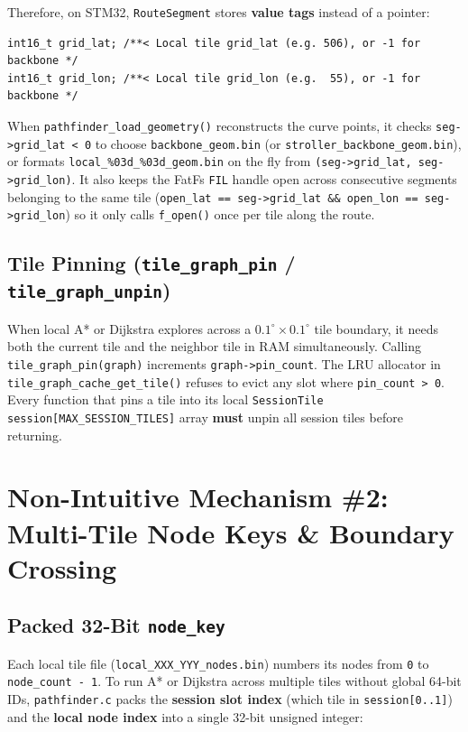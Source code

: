 \documentclass[11pt,a4paper]{article}
\begin{document}
Therefore, on STM32, \texttt{RouteSegment} stores \textbf{value tags} instead of a pointer:
\begin{lstlisting}[caption={Value-based geometry source tagging in \texttt{RouteSegment}}]
int16_t grid_lat; /**< Local tile grid_lat (e.g. 506), or -1 for backbone */
int16_t grid_lon; /**< Local tile grid_lon (e.g.  55), or -1 for backbone */
\end{lstlisting}
When \texttt{pathfinder\_load\_geometry()} reconstructs the curve points, it checks \texttt{seg->grid\_lat < 0} to choose \texttt{backbone\_geom.bin} (or \texttt{stroller\_backbone\_geom.bin}), or formats \texttt{local\_\%03d\_\%03d\_geom.bin} on the fly from \texttt{(seg->grid\_lat, seg->grid\_lon)}. It also keeps the FatFs \texttt{FIL} handle open across consecutive segments belonging to the same tile (\texttt{open\_lat == seg->grid\_lat \&\& open\_lon == seg->grid\_lon}) so it only calls \texttt{f\_open()} once per tile along the route.

\subsection{Tile Pinning (\texttt{tile\_graph\_pin} / \texttt{tile\_graph\_unpin})}

When local A* or Dijkstra explores across a $0.1^\circ \times 0.1^\circ$ tile boundary, it needs both the current tile and the neighbor tile in RAM simultaneously. Calling \texttt{tile\_graph\_pin(graph)} increments \texttt{graph->pin\_count}. The LRU allocator in \texttt{tile\_graph\_cache\_get\_tile()} refuses to evict any slot where \texttt{pin\_count > 0}. Every function that pins a tile into its local \texttt{SessionTile session[MAX\_SESSION\_TILES]} array \textbf{must} unpin all session tiles before returning.

\section{Non-Intuitive Mechanism \#2: Multi-Tile Node Keys \& Boundary Crossing}

\subsection{Packed 32-Bit \texttt{node\_key}}

Each local tile file (\texttt{local\_XXX\_YYY\_nodes.bin}) numbers its nodes from \texttt{0} to \texttt{node\_count - 1}. To run A* or Dijkstra across multiple tiles without global 64-bit IDs, \texttt{pathfinder.c} packs the \textbf{session slot index} (which tile in \texttt{session[0..1]}) and the \textbf{local node index} into a single 32-bit unsigned integer:
\end{document}
